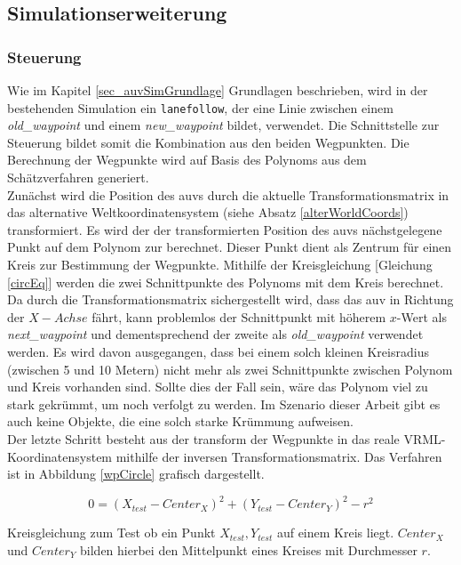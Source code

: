 \subsection{Simulationserweiterung}
\subsubsection{Steuerung}
\label{sec_waypoint}
Wie im Kapitel \ref{sec_auvSimGrundlage} Grundlagen beschrieben, wird in der bestehenden Simulation ein \texttt{\gls{lanefollow}}, der eine Linie zwischen einem \textit{old\_waypoint} und einem \textit{new\_waypoint} bildet, verwendet.
Die Schnittstelle zur Steuerung bildet somit die Kombination aus den beiden Wegpunkten. Die Berechnung der Wegpunkte wird auf Basis des Polynoms aus dem Schätzverfahren generiert.\\
Zunächst wird die Position des \gls{auv}s durch die aktuelle Transformationsmatrix in das alternative Weltkoordinatensystem (siehe Absatz \ref{alterWorldCoords}) transformiert. Es wird der der transformierten Position des \gls{auv}s nächstgelegene Punkt auf dem Polynom zur  berechnet. Dieser Punkt dient als Zentrum für einen Kreis zur Bestimmung der Wegpunkte. Mithilfe der Kreisgleichung [Gleichung \ref{circEq}] werden die zwei Schnittpunkte des Polynoms mit dem Kreis berechnet. Da durch die Transformationsmatrix sichergestellt wird, dass das \gls{auv} in Richtung der $X-Achse$ fährt, kann problemlos der Schnittpunkt mit höherem $x$-Wert als \textit{next\_waypoint} und dementsprechend der zweite als \textit{old\_waypoint} verwendet werden. Es wird davon ausgegangen, dass bei einem solch kleinen Kreisradius (zwischen 5 und 10 Metern) nicht mehr als zwei Schnittpunkte zwischen Polynom und Kreis vorhanden sind. Sollte dies der Fall sein, wäre das Polynom viel zu stark gekrümmt, um noch verfolgt zu werden. Im Szenario dieser Arbeit gibt es auch keine Objekte, die eine solch starke Krümmung aufweisen.\\
Der letzte Schritt besteht aus der \gls{transform} der Wegpunkte in das reale VRML-Koordinatensystem mithilfe der inversen Transformationsmatrix.
Das Verfahren ist in Abbildung \ref{wpCircle} grafisch dargestellt.

\begin{ownequation}[H]
\begin{equation}
0 = (X_{test}-Center_X)^2+(Y_{test}-Center_Y)^2 - r^2
\end{equation}
\caption[Kreisgleichung zum Test, ob ein Punkt auf einem Kreis liegt.]{Kreisgleichung zum Test ob ein Punkt $X_{test},Y_{test}$ auf einem Kreis liegt. $Center_X$ und $Center_Y$ bilden hierbei den Mittelpunkt eines Kreises mit Durchmesser $r$.}
\label{circEq}
\end{ownequation}

